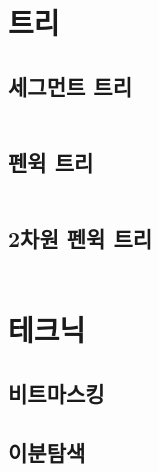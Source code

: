 \documentclass{article}
\begin{document}
\section{트리}
\subsection{세그먼트 트리}
\inputminted{cpp}{codes/segtree.cpp}
\subsection{펜윅 트리}
\inputminted{python}{codes/fenwick.py}
\subsection{2차원 펜윅 트리}
\inputminted{python}{codes/fenwick2d.py}

\section{테크닉}
\subsection{비트마스킹}
\subsection{이분탐색}
\inputminted{python}{codes/bisect.py}



%
%
	
\end{document}
